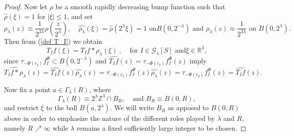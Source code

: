 \documentclass{amsart}%
\theoremstyle{plain}
\numberwithin{equation}{section}
\begin{document}
\begin{proof}
Now let $\rho$ be a smooth rapidly decreasing bump function such that
$\widehat{\rho}\left(  \xi\right)  =1$ for $\left\vert \xi\right\vert \leq1$,
and set%
\[
\rho_{\lambda}\left(  z\right)  \equiv\frac{1}{2^{3\lambda}}\rho\left(
\frac{z}{2^{\lambda}}\right)  ,\ \ \ \ \ \widehat{\rho_{\lambda}}\left(
\xi\right)  =\widehat{\rho}\left(  2^{\lambda}\xi\right)  =1\text{ on
}B\left(  0,2^{-\lambda}\right)  \text{ and }\rho_{\lambda}\left(  z\right)
\approx\frac{1}{2^{3\lambda}}\text{ on }B\left(  0,2^{\lambda}\right)  .
\]
Then from (\ref{def T_I}) we obtain%
\[
T_{I}f\left(  \xi\right)  =T_{I}f\ast\rho_{\lambda}\left(  \xi\right)
\ ,\ \ \ \ \ \text{for }I\in\mathcal{G}_{\lambda}\left[  S\right]  \text{ and
}\xi\in\mathbb{R}^{3},
\]
since $\tau_{-\Phi\left(  c_{I}\right)  }f_{I}^{\Phi}\subset B\left(
0,2^{-\lambda}\right)  $ and $\widehat{T_{I}f}\left(  z\right)  =\tau
_{-\Phi\left(  c_{I}\right)  }f_{I}^{\Phi}\left(  z\right)  $ imply%
\[
\widehat{T_{I}f\ast\rho_{\lambda}}\left(  z\right)  =\widehat{T_{I}f}\left(
z\right)  \widehat{\rho_{\lambda}}\left(  z\right)  =\tau_{-\Phi\left(
c_{I}\right)  }f_{I}^{\Phi}\left(  z\right)  \widehat{\rho_{\lambda}}\left(
z\right)  =\tau_{-\Phi\left(  c_{I}\right)  }f_{I}^{\Phi}\left(  z\right)
=\widehat{T_{I}f}\left(  z\right)  .
\]


Now fix a point $a\in\Gamma_{\lambda}\left(  R\right)  $, where%
\[
\Gamma_{\lambda}\left(  R\right)  \equiv2^{\lambda}\mathbb{Z}^{3}\cap
B_{R},\ \ \ \ \ \text{and }B_{R}\equiv B\left(  0,R\right)  ,
\]
and restrict $\xi$ to the ball $B\left(  a,2^{\lambda}\right)  $. We will
write $B_{R}$ as apposed to $B\left(  0,R\right)  $ above in order to
emphasize the nature of the different roles played by $\lambda$ and $R$,
namely $R\nearrow\infty$ while $\lambda$ remains a fixed sufficiently large
integer to be chosen.


\end{proof}
\end{document}
